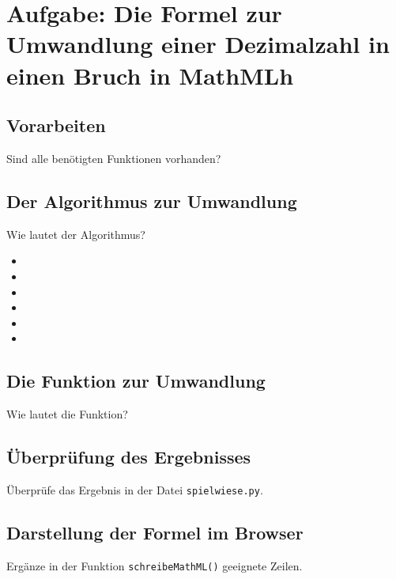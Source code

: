 \section{Aufgabe: Die Formel zur Umwandlung einer Dezimalzahl in einen Bruch in MathMLh}

\subsection*{Vorarbeiten}

Sind alle benötigten Funktionen vorhanden?

\subsection*{Der Algorithmus zur Umwandlung}

Wie lautet der Algorithmus?

{\Large
	\begin{itemize}
		\item  
		\item  
		\item  
		\item  
		\item  
		\item  
	\end{itemize}
}

\subsection*{Die Funktion zur Umwandlung}

Wie lautet die Funktion?

\subsection*{Überprüfung des Ergebnisses}

Überprüfe das Ergebnis in der Datei \texttt{spielwiese.py}.

\subsection*{Darstellung der Formel im Browser}

Ergänze in der Funktion \texttt{schreibeMathML()} geeignete Zeilen.